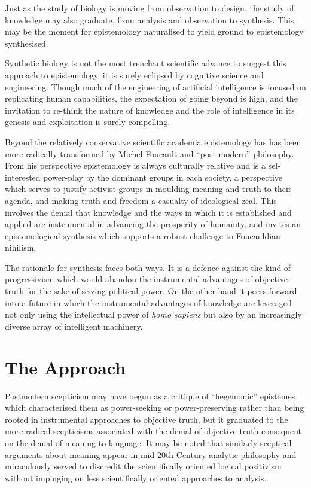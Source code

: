 \documentclass[10pt,titlepage]{book}
\begin{document}
Just as the study of biology is moving from observation to design, the study of knowledge may also graduate, from analysis and observation to synthesis.
This may be the moment for epistemology naturalised to yield ground to epistemology synthesised.

Synthetic biology is not the most trenchant scientific advance to suggest this approach to epistemology, it is surely eclipsed by cognitive science and engineering.
Though much of the engineering of artificial intelligence is focused on replicating human capabilities, the expectation of going beyond is high, and the invitation to re-think the nature of knowledge and the role of intelligence in its genesis and exploitation is surely compelling.

Beyond the relatively conservative scientific academia epistemology has has been more radically transformed by Michel Foucault and ``post-modern'' philosophy.
From his perspective epistemology is always culturally relative and is a sel-interested power-play by the dominant groups in each society, a perspective which serves to justify activist groups in moulding meaning and truth to their agenda, and making truth and freedom a casualty of ideological zeal.
This involves the denial that knowledge and the ways in which it is established and applied are instrumental in advancing the prosperity of humanity, and invites an epistemological synthesis which supports a robust challenge to Foucauldian nihilism.

The rationale for synthesis faces both ways.
It is a defence against the kind of progressivism which would abandon the instrumental advantages of objective truth for the sake of seizing political power.
On the other hand it peers forward into a future in which the instrumental advantages of knowledge are leveraged not only using the intellectual power of \emph{homo sapiens} but also by an increasingly diverse array of intelligent machinery.

\section{The Approach}

Postmodern scepticism may have begun as a critique of ``hegemonic'' epistemes which characterised them as power-seeking or power-preserving rather than being rooted in instrumental approaches to objective truth, but it graduated to the more radical scepticisms associated with the denial of objective truth consequent on the denial of meaning to language.
It may be noted that similarly sceptical arguments about meaning appear in mid 20th Century analytic philosophy and miraculously served to discredit the scientifically oriented logical positivism without impinging on less scientifically oriented approaches to analysis.
\end{document}
